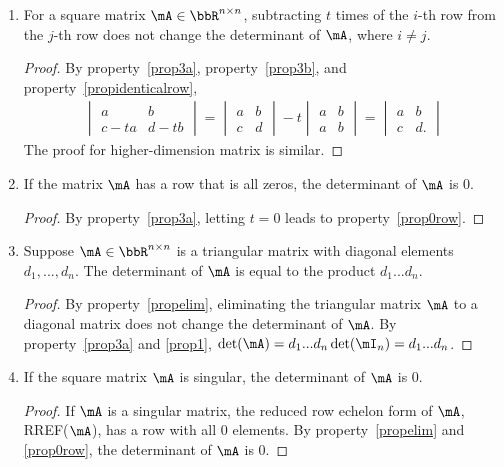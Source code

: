 \documentclass[11pt]{article}
\theoremstyle{plain}
\theoremstyle{definition}
\begin{document}
\begin{enumerate}
	\item \label{propelim} For a square matrix $\mA \in \bbR^{n \times n}$, subtracting $t$ times of the $i$-th row from the $j$-th row does not change the determinant of $\mA$, where $i \neq j$.
	\begin{proof}
		By property~\ref{prop3a}, property~\ref{prop3b}, and property~\ref{propidenticalrow}, 
	\begin{align}
		 \begin{vmatrix}
			a & b \\ c - ta&d -tb
		\end{vmatrix} = \begin{vmatrix}
			a & b \\ c &d
		\end{vmatrix} -t \begin{vmatrix}
			a & b \\ a& b
		\end{vmatrix}  = \begin{vmatrix}
			a & b \\ c &d.
		\end{vmatrix}
	\end{align}
	The proof for higher-dimension matrix is similar.
	\end{proof}
	
	\item\label{prop0row} If the matrix $\mA$ has a row that is all zeros, the determinant of $\mA$ is 0.
	\begin{proof}
		By property~\ref{prop3a}, letting $t = 0$ leads to property~\ref{prop0row}.
	\end{proof}

	
	\item\label{propdiag} Suppose $\mA \in \bbR^{n \times n}$ is a triangular matrix with diagonal elements $d_1,...,d_n$. The determinant of $\mA$ is equal to the product $d_1 ...d_n$.
	
	\begin{proof}
		By property~\ref{propelim}, eliminating the triangular matrix $\mA$ to a diagonal matrix does not change the determinant of $\mA$. By property~\ref{prop3a} and \ref{prop1}, $\det(\mA) = d_1 ...d_n \det(\mI_n) = d_1 ...d_n $. 
	\end{proof}

	
	\item\label{propsingular} If the square matrix $\mA$ is singular, the determinant of $\mA$ is 0.
	
	\begin{proof}
		If $\mA$ is a singular matrix, the reduced row echelon form of $\mA$, RREF($\mA$), has a row with all 0 elements. By property~\ref{propelim} and \ref{prop0row}, the determinant of $\mA$ is 0.
	\end{proof}


\end{enumerate}
\end{document}

